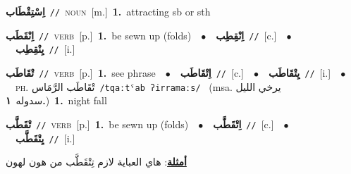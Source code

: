\documentclass[10pt,a4paper,twoside]{article} %
\begin{document}
\begin{multicols}{2}
{\setlength\topsep{0pt}\textbf{\foreignlanguage{arabic}{اِسْتِقْطَاب}}\ {\color{gray}\texttt{//}\color{black}}\ \textsc{noun}\ [m.]\ \textbf{1.}~attracting sb or sth\ } \vspace{2mm}

{\setlength\topsep{0pt}\textbf{\foreignlanguage{arabic}{اِنْقَطَب}}\ {\color{gray}\texttt{//}\color{black}}\ \textsc{verb}\ [p.]\ \textbf{1.}~be sewn up (folds)\ \ $\bullet$\ \ \setlength\topsep{0pt}\textbf{\foreignlanguage{arabic}{اِنْقِطِب}}\ {\color{gray}\texttt{//}\color{black}}\ [c.]\ \ $\bullet$\ \ \setlength\topsep{0pt}\textbf{\foreignlanguage{arabic}{يِنْقِطِب}}\ {\color{gray}\texttt{//}\color{black}}\ [i.]\ } \vspace{2mm}

{\setlength\topsep{0pt}\textbf{\foreignlanguage{arabic}{تْقَاطَب}}\ {\color{gray}\texttt{//}\color{black}}\ \textsc{verb}\ [p.]\ \textbf{1.}~see phrase\ \ $\bullet$\ \ \setlength\topsep{0pt}\textbf{\foreignlanguage{arabic}{اِتْقَاطَب}}\ {\color{gray}\texttt{//}\color{black}}\ [c.]\ \ $\bullet$\ \ \setlength\topsep{0pt}\textbf{\foreignlanguage{arabic}{يِتْقَاطَب}}\ {\color{gray}\texttt{//}\color{black}}\ [i.]\ \ $\bullet$\ \ \textsc{ph.} \color{gray} \foreignlanguage{arabic}{تْقَاطَب الرَّمَاس}\color{black}\ {\color{gray}\texttt{/{\sffamily tqaːtˤab ʔirramaːs}/}\color{black}}\ \color{gray} (msa. \foreignlanguage{arabic}{يرخي الليل سدوله}~\foreignlanguage{arabic}{\textbf{١.}})\color{black}\ \textbf{1.}~night fall\ } \vspace{2mm}

{\setlength\topsep{0pt}\textbf{\foreignlanguage{arabic}{تْقَطَّب}}\ {\color{gray}\texttt{//}\color{black}}\ \textsc{verb}\ [p.]\ \textbf{1.}~be sewn up (folds)\ \ $\bullet$\ \ \setlength\topsep{0pt}\textbf{\foreignlanguage{arabic}{اِتْقَطَّب}}\ {\color{gray}\texttt{//}\color{black}}\ [c.]\ \ $\bullet$\ \ \setlength\topsep{0pt}\textbf{\foreignlanguage{arabic}{يِتْقَطَّب}}\ {\color{gray}\texttt{//}\color{black}}\ [i.]\  \begin{flushright}\color{gray}\foreignlanguage{arabic}{\textbf{\underline{\foreignlanguage{arabic}{أمثلة}}}: هاي العباية لازم تِتْقَطَّب من هون لهون}\end{flushright}\color{black}} \vspace{2mm}


\end{multicols}
\end{document}
